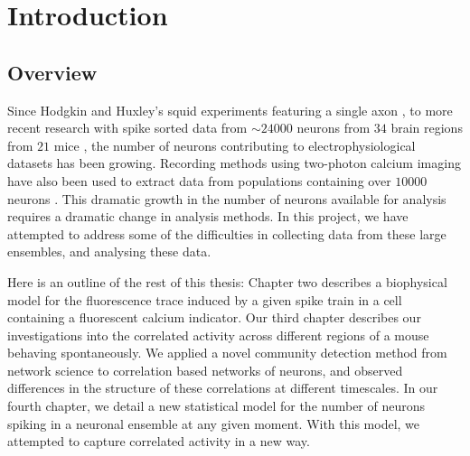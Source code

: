 \chapter{Introduction}

\label{chap:intro}

\section{Overview}

Since Hodgkin and Huxley's squid experiments featuring a single axon \parencite{hodgkin}, to more recent research with spike sorted data from  $\sim 24000$ neurons from $34$ brain regions from $21$ mice \parencite{allen}, the number of neurons contributing to electrophysiological datasets has been growing. Recording methods using two-photon calcium imaging have also been used to extract data from populations containing over $10000$ neurons \parencite{peron}. This dramatic growth in the number of neurons available for analysis requires a dramatic change in analysis methods. In this project, we have attempted to address some of the difficulties in collecting data from these large ensembles, and analysing these data.

Here is an outline of the rest of this thesis: Chapter two describes a biophysical model for the fluorescence trace induced by a given spike train in a cell containing a fluorescent calcium indicator. Our third chapter describes our investigations into the correlated activity across different regions of a mouse behaving spontaneously. We applied a novel community detection method \parencite{humphries} from network science to correlation based networks of neurons, and observed differences in the structure of these correlations at different timescales. In our fourth chapter, we detail a new statistical model for the number of neurons spiking in a neuronal ensemble at any given moment. With this model, we attempted to capture correlated activity in a new way.

